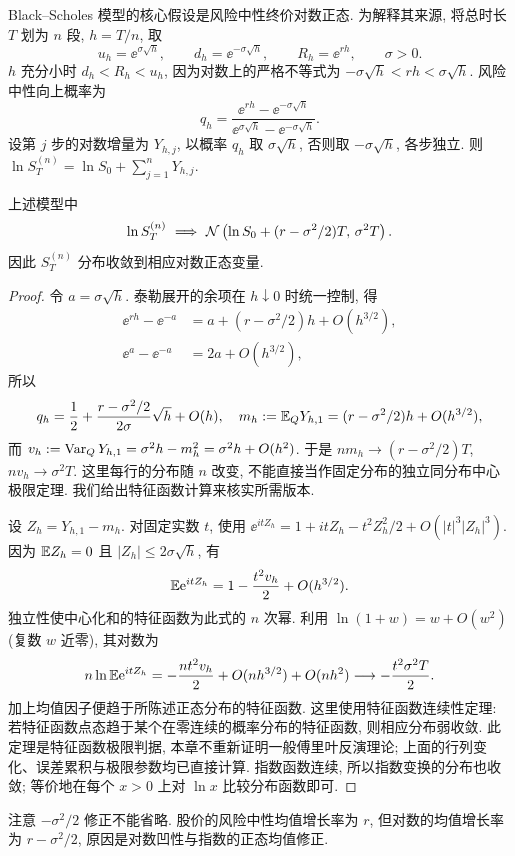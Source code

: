 Black--Scholes 模型的核心假设是风险中性终价对数正态. 为解释其来源, 将总时长 $T$ 划为 $n$ 段, $h=T/n$, 取
\[
 u_h=\ee^{\sigma\sqrt h},\qquad d_h=\ee^{-\sigma\sqrt h},
 \qquad R_h=\ee^{rh},\qquad \sigma>0.
\]
$h$ 充分小时 $d_h<R_h<u_h$, 因为对数上的严格不等式为
$-\sigma\sqrt h<rh<\sigma\sqrt h$. 风险中性向上概率为
\[
 q_h=\frac{\ee^{rh}-\ee^{-\sigma\sqrt h}}
 {\ee^{\sigma\sqrt h}-\ee^{-\sigma\sqrt h}}.
\]
设第 $j$ 步的对数增量为 $Y_{h,j}$, 以概率 $q_h$ 取 $\sigma\sqrt h$, 否则取 $-\sigma\sqrt h$, 各步独立. 则
$\ln S_T^{(n)}=\ln S_0+\sum_{j=1}^nY_{h,j}$.

\begin{proposition}[固定终期的正态极限]
上述模型中
\[
 \ln S_T^{(n)}\ \Longrightarrow\
 \Normal\left(\ln S_0+(r-\sigma^2/2)T,\,\sigma^2T\right).
\]
因此 $S_T^{(n)}$ 分布收敛到相应对数正态变量.
\end{proposition}
\begin{proof}
令 $a=\sigma\sqrt h$. 泰勒展开的余项在 $h\downarrow0$ 时统一控制, 得
\begin{align*}
 \ee^{rh}-\ee^{-a}&=a+(r-\sigma^2/2)h+O(h^{3/2}),\\
 \ee^a-\ee^{-a}&=2a+O(h^{3/2}),
\end{align*}
所以
\[
 q_h=\frac12+\frac{r-\sigma^2/2}{2\sigma}\sqrt h+O(h),
 \quad m_h:=\mathbb E_QY_{h,1}=(r-\sigma^2/2)h+O(h^{3/2}),
\]
而 $v_h:=\operatorname{Var}_QY_{h,1}=\sigma^2h-m_h^2=\sigma^2h+O(h^2)$.
于是 $nm_h\to(r-\sigma^2/2)T$, $nv_h\to\sigma^2T$.
这里每行的分布随 $n$ 改变, 不能直接当作固定分布的独立同分布中心极限定理. 我们给出特征函数计算来核实所需版本.

设 $Z_h=Y_{h,1}-m_h$. 对固定实数 $t$, 使用
$\ee^{itZ_h}=1+itZ_h-t^2Z_h^2/2+O(|t|^3|Z_h|^3)$.
因为 $\mathbb E Z_h=0$ 且 $|Z_h|\leq2\sigma\sqrt h$, 有
\[
 \mathbb E\mathrm e^{itZ_h}=1-\frac{t^2v_h}2+O(h^{3/2}).
\]
独立性使中心化和的特征函数为此式的 $n$ 次幂. 利用
$\ln(1+w)=w+O(w^2)$ (复数 $w$ 近零), 其对数为
\[
 n\ln\mathbb E\mathrm e^{itZ_h}
 =-\frac{nt^2v_h}2+O(nh^{3/2})+O(nh^2)
 \longrightarrow-\frac{t^2\sigma^2T}2.
\]
加上均值因子便趋于所陈述正态分布的特征函数. 这里使用特征函数连续性定理: 若特征函数点态趋于某个在零连续的概率分布的特征函数, 则相应分布弱收敛. 此定理是特征函数极限判据, 本章不重新证明一般傅里叶反演理论; 上面的行列变化、误差累积与极限参数均已直接计算. 指数函数连续, 所以指数变换的分布也收敛; 等价地在每个 $x>0$ 上对 $\ln x$ 比较分布函数即可.
\end{proof}
注意 $-\sigma^2/2$ 修正不能省略. 股价的风险中性均值增长率为 $r$, 但对数的均值增长率为 $r-\sigma^2/2$, 原因是对数凹性与指数的正态均值修正.

